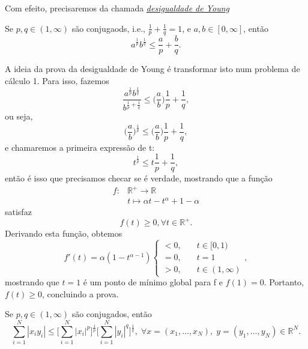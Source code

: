 \documentclass[../functional_analysis.tex]{subfiles}
\begin{document}
Com efeito, precisaremos da chamada \hyperlink{young_inequality}{\textit{desigualdade de Young}}
\hypertarget{young_inequality}{
	\begin{lemma*}
		Se \(p, q\in (1, \infty)\) são conjugaods, i.e., \(\frac{1}{p} + \frac{1}{q} = 1\), e \(a, b\in [0, \infty]\), então
		\[
			a^{\frac{1}{p}}b^{\frac{1}{q}} \leq \frac{a}{p} + \frac{b}{q}.
		\]
	\end{lemma*}
}
\begin{proof*}
	A ideia da prova da desigualdade de Young é transformar isto num problema de cálculo 1. Para isso, fazemos
	\[
		\frac{a^{\frac{1}{p}}b^{\frac{1}{q}}}{b^{\frac{1}{p}+\frac{1}{q}}} \leq \biggl(\frac{a}{b}\biggr)\frac{1}{p} + \frac{1}{q},
	\]
	ou seja,
	\[
		\biggl(\frac{a}{b}\biggr)^{\frac{1}{p}}\leq \biggl(\frac{a}{b}\biggr)\frac{1}{p} + \frac{1}{q},
	\]
	e chamaremos a primeira expressão de t:
	\[
		t^{\frac{1}{p}} \leq t \frac{1}{p} + \frac{1}{q},
	\]
	então é isso que precisamos checar se é verdade, mostrando que a função
	\begin{align*}
		f: & \mathbb{R}^{+}\rightarrow \mathbb{R}          \\
		   & t \mapsto \alpha t - t^{\alpha } + 1 - \alpha
	\end{align*}
	satisfaz
	\[
		f(t)\geq 0, \forall t\in \mathbb{R}^{+}.
	\]
	Derivando esta função, obtemos
	\[
		f'(t) = \alpha (1-t^{\alpha -1})  \left\{\begin{array}{ll}
			<0,  & \quad t\in [0, 1)      \\
			= 0, & \quad t=1              \\
			>0,  & \quad t\in (1, \infty)
		\end{array}\right.,
	\]
	mostrando que \(t=1\) é um ponto de mínimo global para f e \(f(1) = 0\). Portanto, \(f(t)\geq 0\), concluindo a prova. \qedsymbol
\end{proof*}
\hypertarget{holder_inequality}{
	\begin{lemma*}
		Se \(p, q\in (1, \infty)\) são conjugados, então
		\[
			\sum\limits_{i=1}^{N}|x_{i}y_{i}| \leq \biggl[\sum\limits_{i=1}^{N}|x_{i}|^{p}\biggr]^{\frac{1}{p}}\biggl[\sum\limits_{i=1}^{N}|y_{i}|^{q}\biggr]^{\frac{1}{q}},\; \forall x=(x_1, \dotsc , x_{N}),\; y = (y_1, \dotsc , y_N)\in \mathbb{R}^{N}.
		\]
	\end{lemma*}
}
\end{document}
